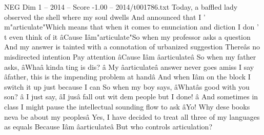 \begin{textsample}{NEG Dim 1 – 2014 – Score -1.00 – 2014/t001786.txt}  \label{ex:f1_neg_034}
Today, a baffled lady observed the shell where my soul dwells And announced that I ' m"articulate"Which means that when it comes to enunciation and diction I don ' t even think of it âCause Iâm"articulate"So when my professor asks a question And my answer is tainted with a connotation of urbanized suggestion Thereâs no misdirected intention Pay attention âCause Iâm âarticulateâ So when my father asks, âWhaâ kinda ting is dis? â My âarticulateâ answer never goes amiss I say âfather, this is the impending problem at handâ And when Iâm on the block I switch it up just because I can So when my boy says, âWhatâs good with you son? â I just say, âI jusâ fall out wit dem people but I done! â And sometimes in class I might pause the intellectual sounding flow to ask âYo!
Why dese books neva be about my peoplesâ Yes, I have decided to treat all three of my languages as equals Because Iâm âarticulateâ But who controls articulation?

\end{textsample}
